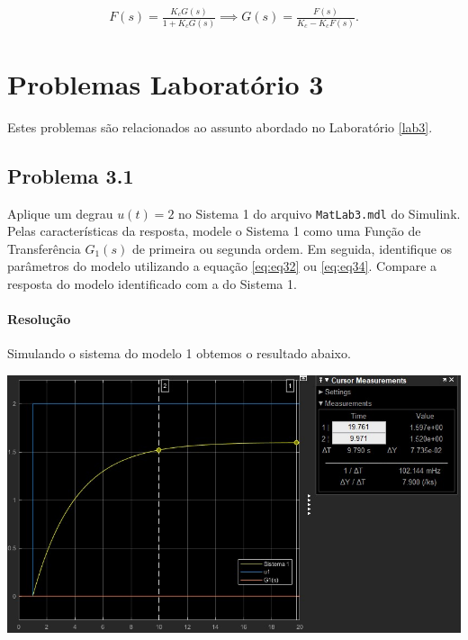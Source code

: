 \documentclass[
]{book}
\theoremstyle{definition}
\theoremstyle{definition}
\theoremstyle{definition}
\theoremstyle{remark}
\begin{document}
\begin{align}
F(s) = \frac {K_cG(s)}{1+K_cG(s)} \implies G(s) = \frac {F(s)}{K_c - K_cF(s)}.  \label{eq:eq35}
\end{align}

\hypertarget{problemas-laboratuxf3rio-3}{%
\chapter*{Problemas Laboratório 3}\label{problemas-laboratuxf3rio-3}}

Estes problemas são relacionados ao assunto abordado no Laboratório \ref{lab3}.

\hypertarget{problema-3.1}{%
\section*{Problema 3.1}\label{problema-3.1}}

Aplique um degrau \(u(t) = 2\) no Sistema 1 do arquivo \texttt{MatLab3.mdl} do Simulink. Pelas características da resposta, modele o Sistema 1 como uma Função de Transferência \(G_1(s)%
\) de primeira ou segunda ordem. Em seguida, identifique os parâmetros do modelo utilizando a equação \eqref{eq:eq32} ou \eqref{eq:eq34}. Compare a resposta do modelo identificado com a do Sistema 1.

\hypertarget{resoluuxe7uxe3o}{%
\subsubsection*{Resolução}\label{resoluuxe7uxe3o}}

Simulando o sistema do modelo 1 obtemos o resultado abaixo.

\includegraphics{Imagens/Lab3/Resolução/prob1A.jpg}
\end{document}
